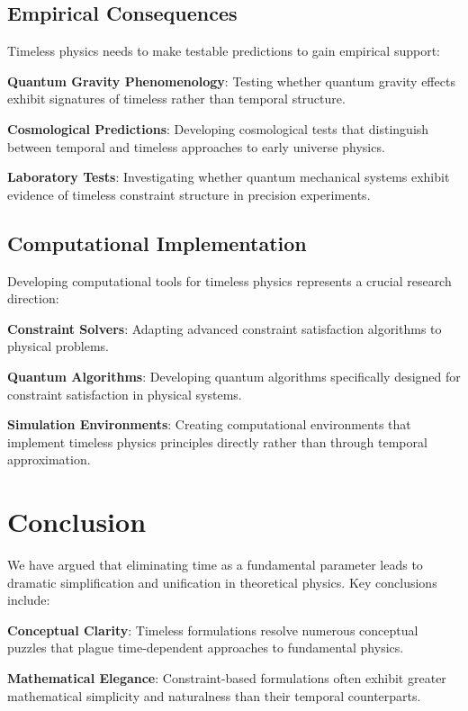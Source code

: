 \documentclass[12pt]{article}
\begin{document}
\subsection{Empirical Consequences}

Timeless physics needs to make testable predictions to gain empirical support:

\textbf{Quantum Gravity Phenomenology}: Testing whether quantum gravity effects exhibit signatures of timeless rather than temporal structure.

\textbf{Cosmological Predictions}: Developing cosmological tests that distinguish between temporal and timeless approaches to early universe physics.

\textbf{Laboratory Tests}: Investigating whether quantum mechanical systems exhibit evidence of timeless constraint structure in precision experiments.

\subsection{Computational Implementation}

Developing computational tools for timeless physics represents a crucial research direction:

\textbf{Constraint Solvers}: Adapting advanced constraint satisfaction algorithms to physical problems.

\textbf{Quantum Algorithms}: Developing quantum algorithms specifically designed for constraint satisfaction in physical systems.

\textbf{Simulation Environments}: Creating computational environments that implement timeless physics principles directly rather than through temporal approximation.

\section{Conclusion}

We have argued that eliminating time as a fundamental parameter leads to dramatic simplification and unification in theoretical physics. Key conclusions include:

\textbf{Conceptual Clarity}: Timeless formulations resolve numerous conceptual puzzles that plague time-dependent approaches to fundamental physics.

\textbf{Mathematical Elegance}: Constraint-based formulations often exhibit greater mathematical simplicity and naturalness than their temporal counterparts.
\end{document}
